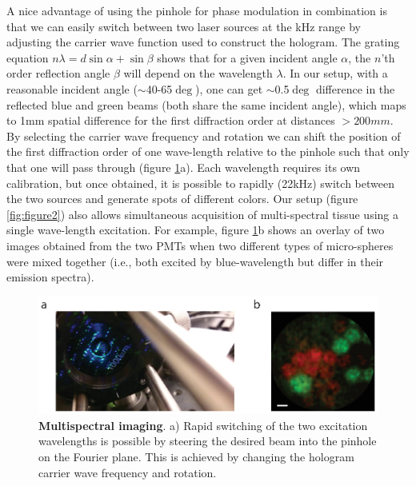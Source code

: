 \documentclass[10pt]{article}
\begin{document}
A nice advantage of using the pinhole for phase modulation in combination is that we can easily switch between two laser sources at the kHz range by adjusting the carrier wave function used to construct the hologram. 
The grating equation 
$n\lambda  = d\sin \alpha  + \sin \beta $ shows that for a given incident angle $\alpha$, the $n$'th order reflection angle $\beta$ will depend on the wavelength $\lambda$. In our setup, with a reasonable incident angle ($\sim$40-65$\deg$), one can get $\sim$0.5$\deg$ difference in the reflected blue and green beams (both share the same incident angle), which maps to 1mm spatial difference for the first diffraction order at distances $>200mm$. By selecting the carrier wave frequency and rotation we can shift the position of the first diffraction order of one wave-length relative to the pinhole such that only that one will pass through (figure \ref{fig:figure7}a). Each wavelength requires its own calibration, but once obtained, it is possible to rapidly (22kHz) switch between the two sources and generate spots of different colors.
Our setup (figure \ref{fig:figure2}) also allows simultaneous acquisition of multi-spectral tissue using a single wave-length excitation. For example, figure \ref{fig:figure7}b shows an overlay of  two images obtained from the two PMTs when two different types of micro-spheres were mixed together (i.e., both excited by blue-wavelength but differ in their emission spectra).

\begin{figure}
\centering\includegraphics[width=12cm]{figure7}
\caption{\textbf{Multispectral imaging}. a) Rapid switching of the two excitation wavelengths is possible by steering the desired beam into the pinhole on the Fourier plane. This is achieved by changing the hologram carrier wave frequency and rotation.}
\label{fig:figure7}
\end{figure}
\end{document}
